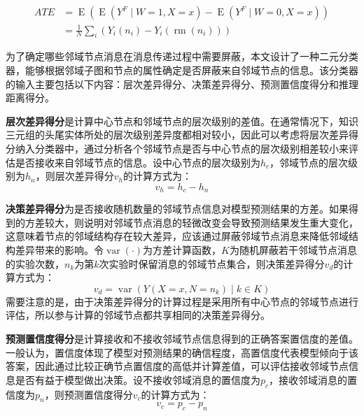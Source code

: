 \documentclass[algorithmlist, AutoFakeBold, AutoFakeSlant, figurelist, tablelist, nomlist, masters]{seuthesix}
\begin{document}
\begin{equation}
  \begin{aligned}
    ATE & =\operatorname{E}\left(\operatorname{E}\left(Y^F \mid W=1, X=x\right)-\operatorname{E}\left(Y^F \mid W=0, X=x\right)\right) \\
    & =\frac{1}{N} \sum_i\left(Y_i(n_i)-Y_i(\operatorname{rm}(n_i))\right)
  \end{aligned}
  \label{equation_CausalInterventionATE}
\end{equation}

为了确定哪些邻域节点消息在消息传递过程中需要屏蔽，本文设计了一种二元分类器，能够根据邻域子图和节点的属性确定是否屏蔽来自邻域节点的信息。该分类器的输入主要包括以下内容：层次差异得分、决策差异得分、预测置信度得分和推理距离得分。

\textbf{层次差异得分}是计算中心节点和邻域节点的层次级别的差值。在通常情况下，知识三元组的头尾实体所处的层次级别差异度都相对较小，因此可以考虑将层次差异得分纳入分类器中，通过分析各个邻域节点是否与中心节点的层次级别相差较小来评估是否接收来自邻域节点的信息。设中心节点的层次级别为$h_c$，邻域节点的层次级别为$h_n$，则层次差异得分$v_h$的计算方式为：
\begin{equation}
  v_h = h_c - h_n
\end{equation}

\textbf{决策差异得分}为是否接收随机数量的邻域节点信息对模型预测结果的方差。如果得到的方差较大，则说明对邻域节点消息的轻微改变会导致预测结果发生重大变化，这意味着节点的邻域结构存在较大差异，应该通过屏蔽邻域节点消息来降低邻域结构差异带来的影响。令$\operatorname{var}(\cdot)$为方差计算函数，$K$为随机屏蔽若干邻域节点消息的实验次数，$n_k$为第$k$次实验时保留消息的邻域节点集合，则决策差异得分$v_d$的计算方式为：
\begin{equation}
  v_d = \operatorname{var}(Y(X=x, N=n_k) \mid k \in K)
\end{equation}
需要注意的是，由于决策差异得分的计算过程是采用所有中心节点的邻域节点进行评估，所以参与计算的邻域节点都共享相同的决策差异得分。

\textbf{预测置信度得分}是计算接收和不接收邻域节点信息得到的正确答案置信度的差值。一般认为，置信度体现了模型对预测结果的确信程度，高置信度代表模型倾向于该答案，因此通过比较正确节点置信度的高低并计算差值，可以评估接收邻域节点信息是否有益于模型做出决策。设不接收邻域消息的置信度为$p_c$，接收邻域消息的置信度为$p_n$，则预测置信度得分$v_c$的计算方式为：
\begin{equation}
  v_c = p_c - p_n
\end{equation}
\end{document}
